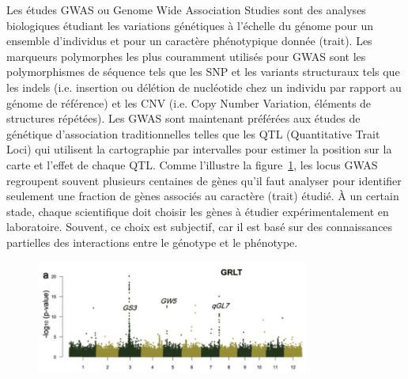 Les études GWAS ou Genome Wide Association Studies sont des analyses biologiques étudiant les variations génétiques à l'échelle du génome pour un ensemble d'individus et pour un caractère phénotypique donnée (trait). Les marqueurs polymorphes les plus couramment utilisés pour GWAS sont les polymorphismes de séquence tels que les SNP et les variants structuraux tels que les indels (i.e. insertion ou délétion de nucléotide chez un individu par rapport au génome de référence) et les CNV (i.e. Copy Number Variation, éléments de structures répétées). Les GWAS sont maintenant préférées aux études de génétique d'association traditionnelles telles que les QTL (Quantitative Trait Loci) qui utilisent la cartographie par intervalles pour estimer la position sur la carte et l'effet de chaque QTL. Comme l'illustre la figure~\ref{fig:plot}, les locus GWAS regroupent souvent plusieurs centaines de gènes qu'il faut analyser pour identifier seulement une fraction de gènes associés au caractère (trait) étudié.  À un certain stade, chaque scientifique doit choisir les gènes à étudier expérimentalement en laboratoire. Souvent, ce choix est subjectif, car il est basé sur des connaissances partielles des interactions entre le génotype et le phénotype.


\begin{figure}[!ht]
    \centering
    \includegraphics[width=0.8\textwidth]{hdr_manuscript/Figures/Manathan_Plot_rice.png}
    \label{fig:plot}
\end{figure}

